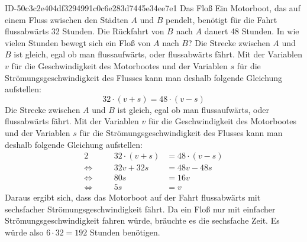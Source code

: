 \begin{exercise}
      {ID-50c3c2e404df3294991c0c6e283d7445e34ee7e1}
      {Das Floß}
  \ifproblem\problem
    Ein Motorboot, das auf einem Fluss zwischen den Städten $A$ und $B$ pendelt,
    benötigt für die Fahrt flussabwärts 32 Stunden. Die Rückfahrt von $B$ nach
    $A$ dauert 48 Stunden. In wie vielen Stunden bewegt sich ein Floß von $A$
    nach $B$?
  \fi
  \ifoutline\outline
    Die Strecke zwischen $A$ und $B$ ist gleich, egal ob man flussaufwärts,
    oder flussabwärts fährt. Mit der Variablen $v$ für die Geschwindigkeit
    des Motorbootes und der Variablen $s$ für die Strömungsgeschwindigkeit
    des Flusses kann man deshalb folgende Gleichung aufstellen:
    \begin{equation*}
      32\cdot(v+s)=48\cdot(v-s)
    \end{equation*}
  \fi
  \ifoutcome\outcome
    Die Strecke zwischen $A$ und $B$ ist gleich, egal ob man flussaufwärts,
    oder flussabwärts fährt. Mit der Variablen $v$ für die Geschwindigkeit
    des Motorbootes und der Variablen $s$ für die Strömungsgeschwindigkeit
    des Flusses kann man deshalb folgende Gleichung aufstellen:
    \begin{alignat*}{2}
                     &\quad & 32\cdot(v+s)&=48\cdot(v-s) \\
      \Leftrightarrow&\quad &      32v+32s&=48v-48s      \\
      \Leftrightarrow&\quad &          80s&=16v          \\
      \Leftrightarrow&\quad &           5s&=v
    \end{alignat*}
    Daraus ergibt sich, dass das Motorboot auf der Fahrt flussabwärts mit
    sechsfacher Strömungsgeschwindigkeit fährt. Da ein Floß nur mit
    einfacher Strömungsgeschwindigkeit \glqq fahren\grqq{} würde, bräuchte
    es die sechsfache Zeit. Es würde also $6\cdot32=192$ Stunden benötigen.
  \fi
\end{exercise}
